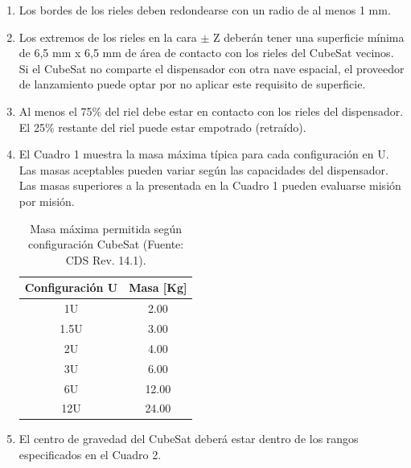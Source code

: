 \documentclass[12pt]{article}
\begin{document}
\begin{enumerate}
		\item Los bordes de los rieles deben redondearse con un radio de al menos 1 mm.
		
		\item Los extremos de los rieles en la cara  $\pm$ Z deberán tener una superficie mínima de 6,5 mm x 6,5 mm de área de contacto con los rieles del CubeSat vecinos. Si el CubeSat no comparte el dispensador con otra nave espacial, el proveedor de lanzamiento puede optar por no aplicar este requisito de superficie.
		
		\item Al menos el 75$\%$ del riel debe estar en contacto con los rieles del dispensador. El 25$\%$ restante del riel puede estar empotrado (retraído).
		
		\item El Cuadro 1 muestra la masa máxima típica para cada configuración en U. Las masas aceptables pueden variar según las capacidades del dispensador. Las masas superiores a la presentada en la Cuadro 1 pueden evaluarse misión por misión.
		
		\begin{table}[h!]
			\centering
			\renewcommand{\arraystretch}{1}
			\begin{tabular}{|c|c|}
				\hline
				Configuración U & Masa [Kg]   \\
				\hline
				1U   & 2.00  \\ \hline
				1.5U & 3.00  \\ \hline
				2U   & 4.00  \\ \hline
				3U   & 6.00  \\ \hline
				6U   & 12.00 \\ \hline
				12U  & 24.00 \\ \hline
			\end{tabular}
			\caption{Masa máxima permitida según configuración CubeSat (Fuente: CDS Rev. 14.1).}
			\label{tab:cubesat_mass}
		\end{table}
		
		\item El centro de gravedad del CubeSat deberá estar dentro de los rangos especificados en el Cuadro 2.
		

\end{enumerate}
\end{document}
